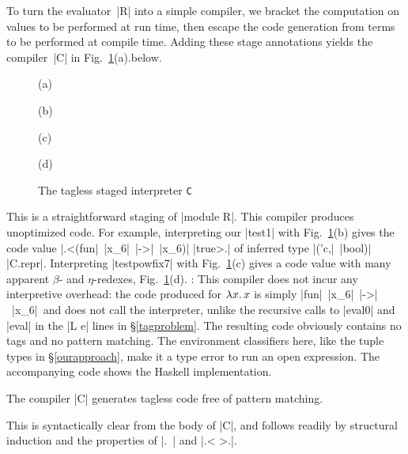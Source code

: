To turn the evaluator~|R| into a simple compiler, we bracket the
computation on values to be performed at run time, then escape the code
generation from terms to be performed at compile time.  Adding these
stage annotations yields the compiler~|C|
\ifshort in Fig.~\ref{fig:interpreter-C}(a).\else below.
\fi
\ifshort
\begin{figure}[t]
(a) 

\smallskip
(b) 

\smallskip
(c) 

\smallskip
(d) 

\medskip
\caption{The tagless staged interpreter \texttt{C}}
\label{fig:interpreter-C}
\end{figure}
\fi
This is a straightforward staging of
|module R|.
This compiler produces
unoptimized code. For example, interpreting our |test1| with
\ifshort Fig.~\ref{fig:interpreter-C}(b) \else {}\fi
gives the code value |.<(fun|~|x_6|~|->|~|x_6)| |true>.|
of inferred type |('c,|~|bool)| |C.repr|.  Interpreting |testpowfix7|
with
\ifshort Fig.~\ref{fig:interpreter-C}(c) \else {}\fi
gives a code value with many apparent $\beta$- and $\eta$-redexes\ifshort,
Fig.~\ref{fig:interpreter-C}(d). \else: \fi
This compiler does not incur
any interpretive overhead: the
code produced for $\mathopen{\lambda\mathord{x}.\,}x$ is simply |fun|~|x_6|~|->|~|x_6|\ifshort\else\
and does not
call the interpreter, unlike the recursive calls to |eval0| and
|eval| in the |L e| lines in \S\ref{tagproblem}\fi.
The resulting code obviously contains no tags and no pattern matching.
The environment classifiers here, like the tuple types in \S\ref{ourapproach},
make it a type error to run an open expression.
\ifshort
The accompanying code shows the Haskell implementation. 
\else
\begin{proposition}
    The compiler |C| generates tagless code free of pattern matching.
\end{proposition}
This is syntactically clear from the body of |C|, and follows
readily by structural induction and the properties of |.~| and
|.< >.|.

